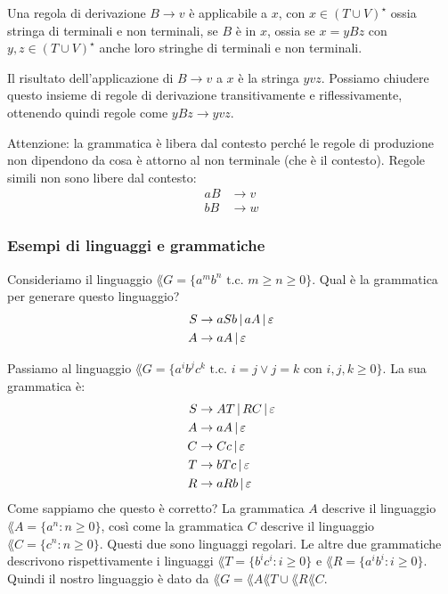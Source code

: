 Una regola di derivazione $B \to v$ \`e applicabile a $x$, con $x \in {(T \cup V)}^{\star}$ ossia stringa di terminali e non terminali, se $B$ \`e in $x$, ossia se $x = y B z$ con $y, z \in {(T \cup V)}^{\star}$ anche loro stringhe di terminali e non terminali.

Il risultato dell'applicazione di $B \to v$ a $x$ \`e la stringa $y v z$.
Possiamo chiudere questo insieme di regole di derivazione transitivamente e riflessivamente, ottenendo quindi regole come $y B z \to y v z$.

Attenzione: la grammatica \`e libera dal contesto perch\'e le regole di produzione non dipendono da cosa \`e attorno al non terminale (che \`e il contesto).
Regole simili non sono libere dal contesto:
\begin{align*}
	a B & \to v \\
	b B & \to w
\end{align*}

\subsubsection{Esempi di linguaggi e grammatiche}

Consideriamo il linguaggio $\lang{G} = \{ a^m b^n \text{ t.c. } m \ge n \ge 0 \}$.
Qual \`e la grammatica per generare questo linguaggio?
\begin{align*}
	S &\to aSb \, | \, aA \, | \, \varepsilon \\
	A &\to aA \, | \, \varepsilon
\end{align*}

Passiamo al linguaggio $\lang{G} = \{ a^i b^j c^k \text{ t.c. } i = j \lor j = k \text{ con } i,j,k \ge 0 \}$.
La sua grammatica \`e:
\begin{align*}
	S &\to AT \, | \, RC \, | \, \varepsilon \\
	A &\to aA \, | \, \varepsilon \\
	C &\to Cc \, | \, \varepsilon \\
	T &\to bTc \, | \, \varepsilon \\
	R &\to aRb \, | \, \varepsilon 
\end{align*}
Come sappiamo che questo \`e corretto?
La grammatica $A$ descrive il linguaggio $\lang{A} = \{ a^n : n \ge 0 \}$, cos\`i come la grammatica $C$ descrive il linguaggio $\lang{C} = \{c^n : n \ge 0\}$.
Questi due sono linguaggi regolari.
Le altre due grammatiche descrivono rispettivamente i linguaggi $\lang{T} = \{ b^i c^i : i \ge 0 \}$ e $\lang{R} = \{ a^i b^i : i \ge 0 \}$.
Quindi il nostro linguaggio \`e dato da $\lang{G} = \lang{A}\lang{T} \cup \lang{R}\lang{C}$.

